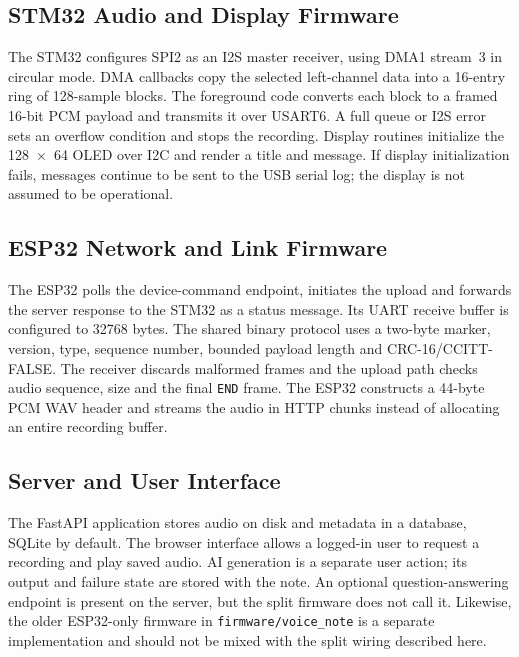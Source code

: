 \subsection{STM32 Audio and Display Firmware}
The STM32 configures SPI2 as an I2S master receiver, using DMA1 stream~3 in circular mode. DMA callbacks copy the selected left-channel data into a 16-entry ring of 128-sample blocks. The foreground code converts each block to a framed 16-bit PCM payload and transmits it over USART6. A full queue or I2S error sets an overflow condition and stops the recording. Display routines initialize the 128~$\times$~64 OLED over I2C and render a title and message. If display initialization fails, messages continue to be sent to the USB serial log; the display is not assumed to be operational.

\subsection{ESP32 Network and Link Firmware}
The ESP32 polls the device-command endpoint, initiates the upload and forwards the server response to the STM32 as a status message. Its UART receive buffer is configured to 32768 bytes. The shared binary protocol uses a two-byte marker, version, type, sequence number, bounded payload length and CRC-16/CCITT-FALSE. The receiver discards malformed frames and the upload path checks audio sequence, size and the final \texttt{END} frame. The ESP32 constructs a 44-byte PCM WAV header and streams the audio in HTTP chunks instead of allocating an entire recording buffer.

\subsection{Server and User Interface}
The FastAPI application stores audio on disk and metadata in a database, SQLite by default. The browser interface allows a logged-in user to request a recording and play saved audio. AI generation is a separate user action; its output and failure state are stored with the note. An optional question-answering endpoint is present on the server, but the split firmware does not call it. Likewise, the older ESP32-only firmware in \texttt{firmware/voice\_note} is a separate implementation and should not be mixed with the split wiring described here.

